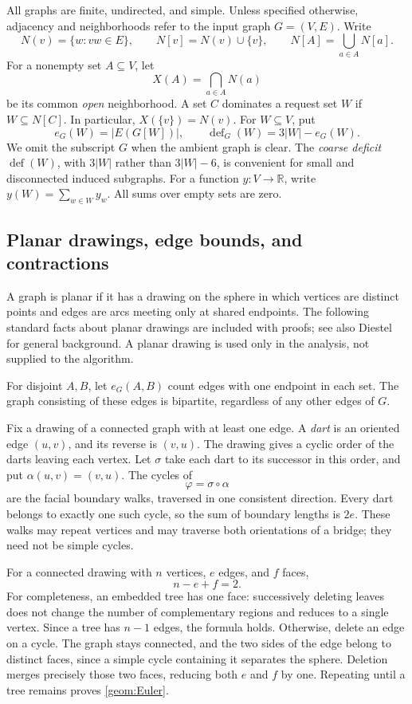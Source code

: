 \documentclass[11pt,a4paper]{article}
\theoremstyle{definition}
\theoremstyle{remark}
\DeclareMathOperator{\Def}{def}
\newcommand{\R}{\mathbb R}
\begin{document}
All graphs are finite, undirected, and simple. Unless specified otherwise,
adjacency and neighborhoods refer to the input graph \(G=(V,E)\). Write
\[
  N(v)=\{w:vw\in E\},\qquad N[v]=N(v)\cup\{v\},\qquad
  N[A]=\bigcup_{a\in A}N[a].
\]
For a nonempty set \(A\subseteq V\), let
\[
  X(A)=\bigcap_{a\in A}N(a)
\]
be its common \emph{open} neighborhood. A set \(C\) dominates a request
set \(W\) if \(W\subseteq N[C]\). In particular, \(X(\{v\})=N(v)\).
For \(W\subseteq V\), put
\[
  e_G(W)=|E(G[W])|,
  \qquad
  \Def_G(W)=3|W|-e_G(W).
\]
We omit the subscript \(G\) when the ambient graph is clear. The
\emph{coarse deficit} \(\Def(W)\), with \(3|W|\) rather than
\(3|W|-6\), is convenient for small and disconnected induced subgraphs.
For a function \(y:V\to\R\), write \(y(W)=\sum_{w\in W}y_w\).
All sums over empty sets are zero.

\subsection{Planar drawings, edge bounds, and contractions}

A graph is planar if it has a drawing on the sphere in which vertices
are distinct points and edges are arcs meeting only at shared endpoints.
The following standard facts about planar drawings are included with
proofs; see also Diestel~\cite[Chapter~4]{Diestel25} for general background.
A planar drawing is used only in the analysis, not supplied to the algorithm.

For disjoint $A,B$, let $e_G(A,B)$ count edges with one endpoint in each
set. The graph consisting of these edges is bipartite, regardless of
any other edges of $G$.

Fix a drawing of a connected graph with at least one edge. A \emph{dart}
is an oriented edge $(u,v)$, and its reverse is $(v,u)$. The drawing gives
a cyclic order of the darts leaving each vertex. Let $\sigma$ take each
dart to its successor in this order, and put $\alpha(u,v)=(v,u)$.
The cycles of
\[
 \varphi=\sigma\circ\alpha
\]
are the facial boundary walks, traversed in one consistent direction.
Every dart belongs to exactly one such cycle, so the sum of boundary
lengths is $2e$. These walks may repeat vertices and may traverse both
orientations of a bridge; they need not be simple cycles.

For a connected drawing with $n$ vertices, $e$ edges, and $f$ faces,
\begin{equation}\label{geom:Euler}
 n-e+f=2.
\end{equation}
For completeness, an embedded tree has one face: successively deleting
leaves does not change the number of complementary regions and reduces
to a single vertex. Since a tree has $n-1$ edges, the formula holds.
Otherwise, delete an edge on a cycle. The graph stays connected, and the
two sides of the edge belong to distinct faces, since a simple cycle
containing it separates the sphere. Deletion merges precisely those two
faces, reducing both $e$ and $f$ by one. Repeating until a tree remains
proves \eqref{geom:Euler}.
\end{document}
